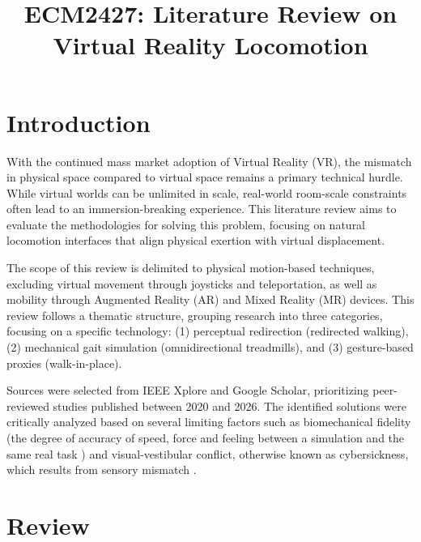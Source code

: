 \documentclass[conference]{IEEEtran}  %
\begin{document}
\title{ECM2427: Literature Review on Virtual Reality Locomotion}


\author{
}

\maketitle  %


\section{Introduction} %

With the continued mass market adoption of Virtual Reality (VR), the mismatch in physical space compared to virtual space remains a primary technical hurdle. While virtual worlds can be unlimited in scale, real-world room-scale constraints often lead to an immersion-breaking experience. This literature review aims to evaluate the methodologies for solving this problem, focusing on natural locomotion interfaces that align physical exertion with virtual displacement.

The scope of this review is delimited to physical motion-based techniques, excluding virtual movement through joysticks and teleportation, as well as mobility through Augmented Reality (AR) and Mixed Reality (MR) devices. This review follows a thematic structure, grouping research into three categories, focusing on a specific technology: (1) perceptual redirection (redirected walking), (2) mechanical gait simulation (omnidirectional treadmills), and (3) gesture-based proxies (walk-in-place). 

Sources were selected from IEEE Xplore and Google Scholar, prioritizing peer-reviewed studies published between 2020 and 2026. The identified solutions were critically analyzed based on several limiting factors such as biomechanical fidelity (the degree of accuracy of speed, force and feeling between a simulation and the same real task \cite{hilt2020biomechanical}) and visual-vestibular conflict, otherwise known as cybersickness, which results from sensory mismatch \cite{van2024sicknificant}.

\section{Review} %
\end{document}
